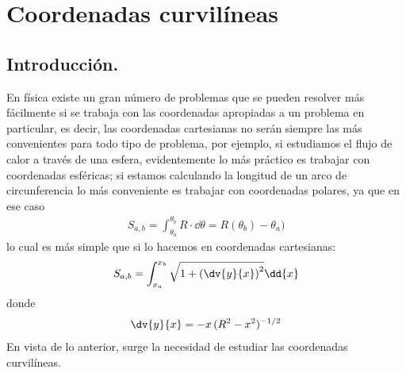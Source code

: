 \chapter{Coordenadas curvilíneas}
\section{Introducción.}
En física existe un gran número de problemas que se pueden resolver más fácilmente si se trabaja con las coordenadas apropiadas a un problema en particular, es decir, las coordenadas cartesianas no serán siempre las más convenientes para todo tipo de problema, por ejemplo, si estudiamos el flujo de calor a través de una esfera, evidentemente lo más práctico es trabajar con coordenadas esféricas; si estamos calculando la longitud de un arco de circunferencia lo más conveniente es trabajar con coordenadas polares, ya que en ese caso
\begin{align*}
S_{a, b} = \int_{\theta_{a}}^{\theta_{b}} R \cdot \dd{\theta} =  R (\theta_b) - \theta_{a})
\end{align*}
lo cual es más simple que si lo hacemos en coordenadas cartesianas:
\begin{align*}
S_{a, b} = \int_{x_{a}}^{x_{b}} \sqrt{1 + \left(\dv{y}{x} \right)^{2}} \dd{x}
\end{align*}
donde
\begin{align*}
\dv{y}{x} = -x \, (R^{2} - x^{2})^{-1/2}
\end{align*}
En vista de lo anterior, surge la necesidad de estudiar las coordenadas curvilíneas.
